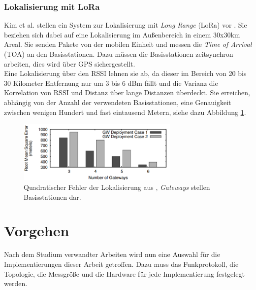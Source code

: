 \subsubsection{Lokalisierung mit LoRa}
\label{ch:Vorherige:sec:lora}
Kim et al. stellen ein System zur Lokalisierung mit \emph{Long Range} (LoRa) vor \cite{kim2016poster}.
Sie beziehen sich dabei auf eine Lokalisierung im Außenbereich in einem 30x30km Areal. 
Sie senden Pakete von der mobilen Einheit und messen die \emph{Time of Arrival} (TOA) an den Basisstationen.
Dazu müssen die Basisstationen zeitsynchron arbeiten, dies wird über GPS sichergestellt.\\
Eine Lokalisierung über den RSSI lehnen sie ab, da dieser im Bereich von 20 bis 30 Kilometer Entfernung nur um 3 bis 6 dBm fällt und die Varianz die Korrelation von RSSI und Distanz über lange Distanzen überdeckt.
Sie erreichen, abhängig von der Anzahl der verwendeten Basisstationen, eine Genauigkeit zwischen wenigen Hundert und fast eintausend Metern, siehe dazu Abbildung \ref{fig:loraacc}.

\begin{figure}[h]
  \centering
	\includegraphics[width=0.7\textwidth]{images/loraacc.png}
  \caption{Quadratischer Fehler der Lokalisierung aus \cite{kim2016poster}, \emph{Gateways} stellen Basisstationen dar.}
  \label{fig:loraacc}
\end{figure}

\section{Vorgehen}
Nach dem Studium verwandter Arbeiten wird nun eine Auswahl für die Implementierungen dieser Arbeit getroffen.
Dazu muss das Funkprotokoll, die Topologie, die Messgröße und die Hardware für jede Implementierung festgelegt werden.

